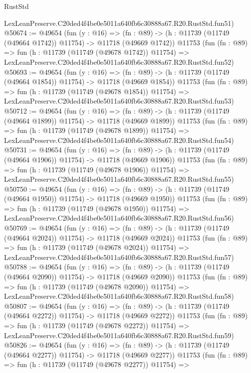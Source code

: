 \begin{lexlean}{RustStd}
\begin{coremodule}
    LexLeanPreserve.C20ded4f4be0e5011a640fb6c30888a67.R20.RustStd.fun51)
@50674 := @49654
    (fun (y : @16) =>
    (fn : @89) -> (h : @11739 (@11749 (@49664 @1742)) @11754) -> @11718 (@49669 @1742))
    @11753
    (fun (fn : @89) =>
    fun (h : @11739 (@11749 (@49678 @1742)) @11754) =>
    LexLeanPreserve.C20ded4f4be0e5011a640fb6c30888a67.R20.RustStd.fun52)
@50693 := @49654
    (fun (y : @16) =>
    (fn : @89) -> (h : @11739 (@11749 (@49664 @1854)) @11754) -> @11718 (@49669 @1854))
    @11753
    (fun (fn : @89) =>
    fun (h : @11739 (@11749 (@49678 @1854)) @11754) =>
    LexLeanPreserve.C20ded4f4be0e5011a640fb6c30888a67.R20.RustStd.fun53)
@50712 := @49654
    (fun (y : @16) =>
    (fn : @89) -> (h : @11739 (@11749 (@49664 @1899)) @11754) -> @11718 (@49669 @1899))
    @11753
    (fun (fn : @89) =>
    fun (h : @11739 (@11749 (@49678 @1899)) @11754) =>
    LexLeanPreserve.C20ded4f4be0e5011a640fb6c30888a67.R20.RustStd.fun54)
@50731 := @49654
    (fun (y : @16) =>
    (fn : @89) -> (h : @11739 (@11749 (@49664 @1906)) @11754) -> @11718 (@49669 @1906))
    @11753
    (fun (fn : @89) =>
    fun (h : @11739 (@11749 (@49678 @1906)) @11754) =>
    LexLeanPreserve.C20ded4f4be0e5011a640fb6c30888a67.R20.RustStd.fun55)
@50750 := @49654
    (fun (y : @16) =>
    (fn : @89) -> (h : @11739 (@11749 (@49664 @1950)) @11754) -> @11718 (@49669 @1950))
    @11753
    (fun (fn : @89) =>
    fun (h : @11739 (@11749 (@49678 @1950)) @11754) =>
    LexLeanPreserve.C20ded4f4be0e5011a640fb6c30888a67.R20.RustStd.fun56)
@50769 := @49654
    (fun (y : @16) =>
    (fn : @89) -> (h : @11739 (@11749 (@49664 @2024)) @11754) -> @11718 (@49669 @2024))
    @11753
    (fun (fn : @89) =>
    fun (h : @11739 (@11749 (@49678 @2024)) @11754) =>
    LexLeanPreserve.C20ded4f4be0e5011a640fb6c30888a67.R20.RustStd.fun57)
@50788 := @49654
    (fun (y : @16) =>
    (fn : @89) -> (h : @11739 (@11749 (@49664 @2090)) @11754) -> @11718 (@49669 @2090))
    @11753
    (fun (fn : @89) =>
    fun (h : @11739 (@11749 (@49678 @2090)) @11754) =>
    LexLeanPreserve.C20ded4f4be0e5011a640fb6c30888a67.R20.RustStd.fun58)
@50807 := @49654
    (fun (y : @16) =>
    (fn : @89) -> (h : @11739 (@11749 (@49664 @2272)) @11754) -> @11718 (@49669 @2272))
    @11753
    (fun (fn : @89) =>
    fun (h : @11739 (@11749 (@49678 @2272)) @11754) =>
    LexLeanPreserve.C20ded4f4be0e5011a640fb6c30888a67.R20.RustStd.fun59)
@50826 := @49654
    (fun (y : @16) =>
    (fn : @89) -> (h : @11739 (@11749 (@49664 @2277)) @11754) -> @11718 (@49669 @2277))
    @11753
    (fun (fn : @89) =>
    fun (h : @11739 (@11749 (@49678 @2277)) @11754) =>

\end{coremodule}
\end{lexlean}
